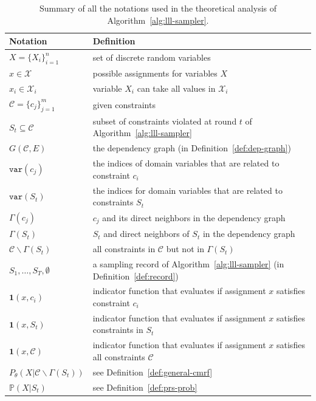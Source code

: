 \documentclass[letterpaper]{article} %
\newcommand{\var}{\mathtt{var}}
\newcommand{\p}{\mathbb{P}}
\begin{document}
\begin{table}[!t]
    \centering
    \caption{Summary of all the notations used in the theoretical analysis of Algorithm~\ref{alg:lll-sampler}.}\label{tab:quantifier}
    \begin{tabular}{ll}
    \hline
    Notation& Definition \\
    \hline
        $X=\{X_i\}_{i=1}^n$ & set of discrete random variables \\
        \hline
        $x\in\mathcal{X}$ & possible assignments for variables $X$ \\
        \hline
        $x_i\in\mathcal{X}_i$ & variable $X_i$ can take all values in $\mathcal{X}_i$\\
        \hline
        $\mathcal{C}=\{c_j\}_{j=1}^{m}$ & given constraints \\
        \hline
        $S_t\subseteq\mathcal{C}$& subset of constraints violated at round  $t$ of Algorithm~\ref{alg:lll-sampler} \\
        \hline
        $G(\mathcal{C},E)$& the dependency graph (in Definition~\ref{def:dep-graph})\\
        \hline
        $\var(c_j)$& the indices of domain variables that are related to constraint $c_i$\\
        \hline
        $\var(S_t)$& the indices for domain variables that are related to constraints $S_t$\\
        \hline
        $\Gamma(c_j)$ &$c_j$ and its direct neighbors in the dependency graph\\
        \hline
        $\Gamma(S_t)$ &$S_t$ and direct neighbors of $S_t$ in the      dependency graph\\
        \hline
        $\mathcal{C}\backslash \Gamma(S_t)$ &all constraints in $\mathcal{C}$ but not in $\Gamma(S_t)$ \\
        \hline
        $S_1,\ldots,S_{T},\emptyset$ & a sampling record of Algorithm~\ref{alg:lll-sampler}  (in Definition~\ref{def:record}) \\
        \hline
        $\mathbf{1}(x,c_i)$ & indicator function that evaluates if    assignment $x$ satisfies constraint $c_i$ \\
        \hline
        $\mathbf{1}(x,S_t)$ & indicator function that evaluates if assignment $x$ satisfies constraints in $S_t$ \\
        \hline
        $\mathbf{1}(x,\mathcal{C})$ & indicator function that evaluates if  assignment $x$ satisfies all constraints $\mathcal{C}$ \\
        \hline
        $P_{\theta}(X|\mathcal{C}\backslash\Gamma(S_t))$& see Definition~\ref{def:general-cmrf}\\
        \hline
        $\p(X|S_t)$ & see Definition~\ref{def:prs-prob}\\
    \hline
    \end{tabular}
\end{table}
\end{document}

